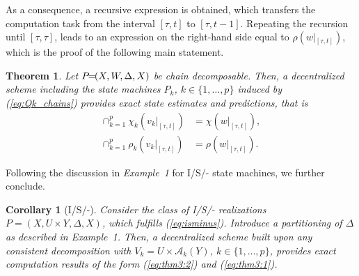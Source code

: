 \documentclass[a4paper, 10pt, conference]{ieeeconf}
\newtheorem{theorem}{Theorem}
\newtheorem{corollary}{Corollary}
\newcommand{\hspm}{\hspace{-2pt}}
\newcommand{\taut}{{_{[\tau,t]}}}
\newcommand{\ak}{\mathcal{A}_k}
\begin{document}
As a consequence, a recursive expression is obtained, which transfers the computation task from the interval $[\tau,t]$ to $[\tau,t-1]$. Repeating the recursion until $[\tau,\tau]$, leads to an expression on the right-hand side equal to $\rho(w|\taut)$, which is the proof of the following main statement.
\begin{theorem}\label{thm:main_2}
Let $P\hspm\hspm=\hspm\hspm(X,W,\Delta,X)$ be chain decomposable. Then, a decentralized scheme including the state machines $P_k$, $k\in\{1,\dots,p\}$ induced by (\ref{eq:Qk_chains}) provides exact state estimates and predictions, that is
\vspace{-2mm}
\begin{subequations}
\begin{align}
\label{eq:thm3:2}
\cap_{k=1}^{p}\chi_k(v_k|_{[\tau,t]})& = \chi(w|_{[\tau,t]}),\\
\label{eq:thm3:1}
\cap_{k=1}^{p}\rho_k(v_k|_{[\tau,t]})& = \rho(w|_{[\tau,t]}).
\end{align}
\end{subequations}
\end{theorem}
\vspace{2mm}
Following the discussion in \emph{Example~1} for I/S/- state machines, we further conclude.
\begin{corollary}[I/S/-]\label{cor:main_iso}
Consider the class of I/S/- realizations $P=(X,U\times Y,\Delta,X)$, which fulfills (\ref{eq:isminus}). Introduce a partitioning of $\Delta$ as described in \emph{Example~1}. Then, a decentralized scheme built upon any consistent decomposition with $V_k = U\times \ak(Y)$, $k\in\{1,\dots,p\}$, provides exact computation results of the form (\ref{eq:thm3:2}) and (\ref{eq:thm3:1}).
\end{corollary}
\end{document}
